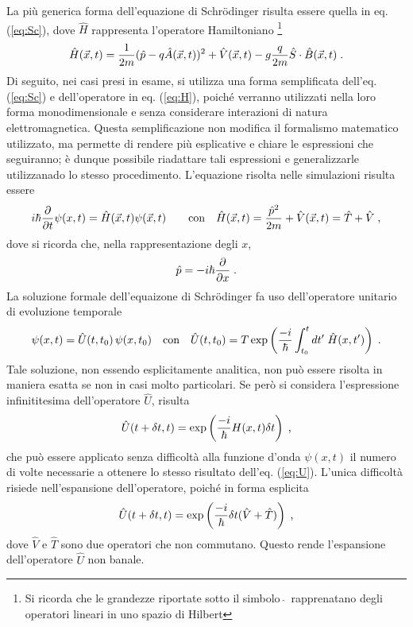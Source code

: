 La più generica forma dell'equazione di Schr\"odinger risulta essere quella in eq. (\ref{eq:Sc}), dove $\hat{H}$ rappresenta l'operatore Hamiltoniano \footnote{Si ricorda che le grandezze riportate sotto il simbolo $\, \hat{ } \,$ rapprenatano degli operatori lineari in uno spazio di Hilbert}
\begin{equation}
    \centering
    \hat{H} (\vec{x}, t) = \frac{1}{2m} (\hat{p} - q \hat{A}(\vec{x}, t) )^2 + \hat{V}(\vec{x}, t) - g \frac{q}{2m} \hat{S} \cdot \hat{B}(\vec{x},t) \; \text{.}
    \label{eq:H}
\end{equation}
Di seguito, nei casi presi in esame, si utilizza una forma semplificata dell'eq. (\ref{eq:Sc}) e dell'operatore in eq. (\ref{eq:H}), poiché verranno utilizzati nella loro forma monodimensionale e senza considerare interazioni di natura elettromagnetica. Questa semplificazione non modifica il formalismo matematico utilizzato, ma permette di rendere più esplicative e chiare le espressioni che seguiranno; è dunque possibile riadattare tali espressioni e generalizzarle utilizzanado lo stesso procedimento. L'equazione risolta nelle simulazioni risulta essere
\begin{equation}
    \centering
    i \hbar \frac{\partial}{\partial t} \psi (x, t) =  \hat{H} (\vec{x}, t) \psi (\vec{x}, t)   \qquad \text{con} \quad \hat{H} (\vec{x}, t) = \frac{\hat{p}^2}{2m}  + \hat{V}(\vec{x}, t) = \hat{T} + \hat{V} \; \text{,}
    \label{eq:Sc_1D}
\end{equation}
dove si ricorda che, nella rappresentazione degli $x$, 
\begin{equation}
    \centering
    \hat{p} = - i \hbar \frac{\partial } {\partial x} \; \text{.}
    \label{eq:p}
\end{equation}
La soluzione formale dell'equaizone di Schr\"odinger fa uso dell'operatore unitario di evoluzione temporale 
\begin{equation}
    \centering
    \psi (x,t) = \hat{U}(t, t_{0}) \, \psi (x, t_0) \quad \text{con} \quad \hat{U}(t, t_{0}) = T  \exp \left(\frac{-i}{\hbar} \int _{t_{0}} ^{t} dt' \; \hat{H}(x,t') \right) \; \text{.}
    \label{eq:U}
\end{equation}
Tale soluzione, non essendo esplicitamente analitica, non può essere risolta in maniera esatta se non in casi molto particolari.
Se però si considera l'espressione infinititesima dell'operatore $\hat{U}$, risulta
\begin{equation}
    \centering
    \hat{U}(t + \delta t, t) = \exp \left(\frac{-i}{\hbar} {H}(x,t) \delta t \right)  \; \text{,}
    \label{eq:U_inf}
\end{equation}
che può essere applicato senza difficoltà alla funzione d'onda $\psi(x,t)$ il numero di volte necessarie a ottenere lo stesso risultato dell'eq. (\ref{eq:U}).
L'unica difficoltà risiede nell'espansione dell'operatore, poiché in forma esplicita  
\begin{equation}
    \centering
    \hat{U}(t + \delta t, t) =  \exp \left(\frac{-i}{\hbar} \delta t (\hat{V} + \hat{T}) \right) \; \text{,}
    \label{eq:U_esplicit} 
\end{equation}
dove $\hat{V}$ e $\hat{T}$ sono due operatori che non commutano. Questo rende l'espansione dell'operatore $\hat{U}$ non banale.